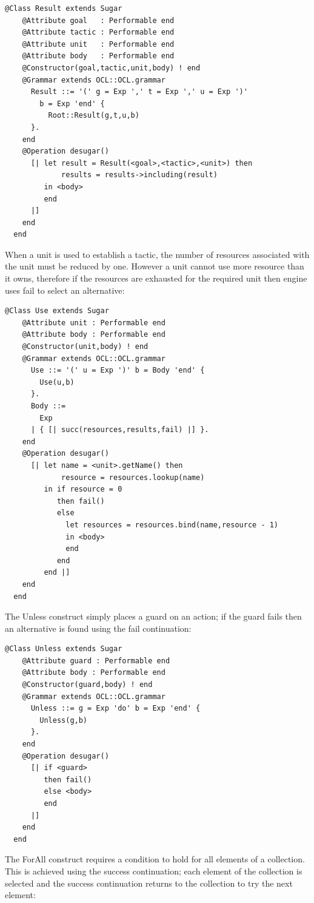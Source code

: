 \begin{lstlisting}
@Class Result extends Sugar
    @Attribute goal   : Performable end
    @Attribute tactic : Performable end
    @Attribute unit   : Performable end
    @Attribute body   : Performable end
    @Constructor(goal,tactic,unit,body) ! end
    @Grammar extends OCL::OCL.grammar
      Result ::= '(' g = Exp ',' t = Exp ',' u = Exp ')' 
        b = Exp 'end' {
          Root::Result(g,t,u,b)
      }.
    end
    @Operation desugar()
      [| let result = Result(<goal>,<tactic>,<unit>) then
             results = results->including(result)
         in <body>
         end
      |]
    end
  end
\end{lstlisting}When a unit is used to establish a tactic, the number of resources
associated with the unit must be reduced by one. However a unit cannot
use more resource than it owns, therefore if the resources are exhausted
for the required unit then engine uses fail to select an alternative:

\begin{lstlisting}
@Class Use extends Sugar
    @Attribute unit : Performable end
    @Attribute body : Performable end
    @Constructor(unit,body) ! end
    @Grammar extends OCL::OCL.grammar
      Use ::= '(' u = Exp ')' b = Body 'end' {
        Use(u,b)
      }.
      Body ::=
        Exp
      | { [| succ(resources,results,fail) |] }.
    end
    @Operation desugar()
      [| let name = <unit>.getName() then
             resource = resources.lookup(name)
         in if resource = 0
            then fail()
            else 
              let resources = resources.bind(name,resource - 1)
              in <body>
              end
            end
         end |]
    end
  end
\end{lstlisting}The Unless construct simply places a guard on an action; if the guard
fails then an alternative is found using the fail continuation:

\begin{lstlisting}
@Class Unless extends Sugar
    @Attribute guard : Performable end
    @Attribute body : Performable end
    @Constructor(guard,body) ! end
    @Grammar extends OCL::OCL.grammar
      Unless ::= g = Exp 'do' b = Exp 'end' {
        Unless(g,b)
      }.
    end
    @Operation desugar()
      [| if <guard>
         then fail()
         else <body>
         end
      |]
    end
  end
\end{lstlisting}The ForAll construct requires a condition to hold for all elements
of a collection. This is achieved using the success continuation;
each element of the collection is selected and the success continuation
returns to the collection to try the next element:

